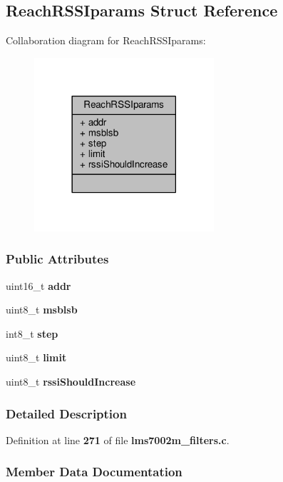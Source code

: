 \subsection{Reach\+R\+S\+S\+Iparams Struct Reference}
\label{structReachRSSIparams}


Collaboration diagram for Reach\+R\+S\+S\+Iparams\+:
\nopagebreak
\begin{figure}[H]
\begin{center}
\leavevmode
\includegraphics[width=189pt]{dd/d22/structReachRSSIparams__coll__graph}
\end{center}
\end{figure}
\subsubsection*{Public Attributes}
\begin{DoxyCompactItemize}
\item 
uint16\+\_\+t {\bf addr}
\item 
uint8\+\_\+t {\bf msblsb}
\item 
int8\+\_\+t {\bf step}
\item 
uint8\+\_\+t {\bf limit}
\item 
uint8\+\_\+t {\bf rssi\+Should\+Increase}
\end{DoxyCompactItemize}


\subsubsection{Detailed Description}


Definition at line {\bf 271} of file {\bf lms7002m\+\_\+filters.\+c}.



\subsubsection{Member Data Documentation}
